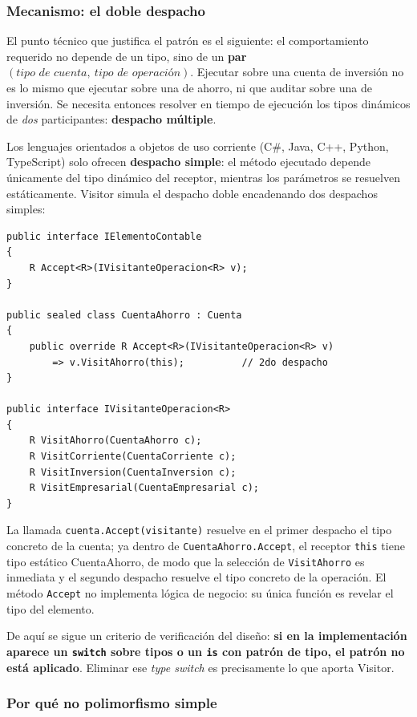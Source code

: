 \subsubsection*{Mecanismo: el doble despacho}

El punto técnico que justifica el patrón es el siguiente: el comportamiento requerido no
depende de un tipo, sino de un \textbf{par} $(\textit{tipo de cuenta},\ \textit{tipo de
operación})$. Ejecutar sobre una cuenta de inversión no es lo mismo que ejecutar sobre una de
ahorro, ni que auditar sobre una de inversión. Se necesita entonces resolver en tiempo de
ejecución los tipos dinámicos de \emph{dos} participantes: \textbf{despacho múltiple}.

Los lenguajes orientados a objetos de uso corriente (C\#, Java, C++, Python, TypeScript) solo
ofrecen \textbf{despacho simple}: el método ejecutado depende únicamente del tipo dinámico del
receptor, mientras los parámetros se resuelven estáticamente. Visitor simula el despacho doble
encadenando dos despachos simples:

\begin{verbatim}
public interface IElementoContable
{
    R Accept<R>(IVisitanteOperacion<R> v);
}

public sealed class CuentaAhorro : Cuenta
{
    public override R Accept<R>(IVisitanteOperacion<R> v)
        => v.VisitAhorro(this);          // 2do despacho
}

public interface IVisitanteOperacion<R>
{
    R VisitAhorro(CuentaAhorro c);
    R VisitCorriente(CuentaCorriente c);
    R VisitInversion(CuentaInversion c);
    R VisitEmpresarial(CuentaEmpresarial c);
}
\end{verbatim}

La llamada \texttt{cuenta.Accept(visitante)} resuelve en el primer despacho el tipo concreto de
la cuenta; ya dentro de \texttt{CuentaAhorro.Accept}, el receptor \texttt{this} tiene tipo
estático CuentaAhorro, de modo que la selección de \texttt{VisitAhorro} es inmediata y el
segundo despacho resuelve el tipo concreto de la operación. El método \texttt{Accept} no
implementa lógica de negocio: su única función es revelar el tipo del elemento.

De aquí se sigue un criterio de verificación del diseño: \textbf{si en la implementación
aparece un \texttt{switch} sobre tipos o un \texttt{is} con patrón de tipo, el patrón no está
aplicado}. Eliminar ese \textit{type switch} es precisamente lo que aporta Visitor.

\subsubsection*{Por qué no polimorfismo simple}

